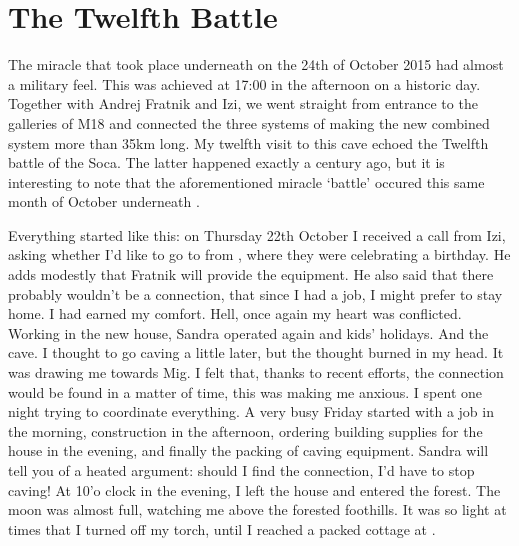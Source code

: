 

\section{The Twelfth Battle}

The miracle that took place underneath  on the 24th of October 2015 had almost a military feel. This was achieved at 17:00 in the afternoon on a historic day. Together with Andrej Fratnik and Izi, we went straight from  entrance to the galleries of M18 and connected the three systems of  making the new combined system more than 35km long. My twelfth visit to this cave echoed the Twelfth battle of the Soca. The latter happened exactly a century ago, but it is interesting to note that the aforementioned miracle `battle' occured this same month of October underneath .   



Everything started like this: on Thursday 22th October I received a call from Izi, asking whether I'd like to go to  from , where they were celebrating a birthday. He adds modestly that Fratnik will provide the equipment. He also said that there probably wouldn't be a connection, that since I had a job, I might prefer to stay home. I had earned my comfort. Hell, once again my heart was conflicted. Working in the new house, Sandra operated again and kids' holidays. And the cave. I thought to go caving a little later, but the thought burned in my head. It was drawing me towards Mig. I felt that, thanks to recent efforts, the connection would be found in a matter of time, this was making me anxious. I spent one night trying to coordinate everything. A very busy Friday started with a job in the morning,  construction in the afternoon, ordering building supplies for the house in the evening, and finally the packing of caving equipment. Sandra will tell you of a heated argument: should I find the connection, I'd have to stop caving!  At 10'o clock in the evening, I left the house and entered the forest.  The moon was almost full, watching me above the forested foothills. It was so light at times that I turned off my torch, until I reached a packed cottage at .

